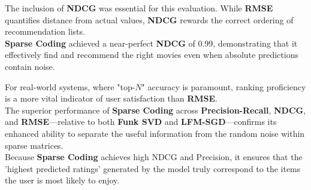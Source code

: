 \documentclass[conference]{IEEEtran}
\begin{document}
The inclusion of \textbf{NDCG} was essential for this evaluation. While \textbf{RMSE} quantifies distance from actual values, \textbf{NDCG} rewards the correct ordering of recommendation lists.\\
\indent \textbf{Sparse Coding} achieved a near-perfect \textbf{NDCG} of 0.99, demonstrating that it effectively find and recommend the right movies even when absolute predictions contain noise. 

For real-world systems, where "top-$N$" accuracy is paramount, ranking proficiency is a more vital indicator of user satisfaction than \textbf{RMSE}.\\
\indent The superior performance of \textbf{Sparse Coding} across \textbf{Precision-Recall}, \textbf{NDCG}, and \textbf{RMSE}---relative to both \textbf{Funk SVD} and \textbf{LFM-SGD}---confirms its enhanced ability to separate the useful information from the random noise within sparse matrices.\\
\indent Because \textbf{Sparse Coding} achieves high NDCG and Precision, it ensures that the 'highest predicted ratings' generated by the model truly correspond to the items the user is most likely to enjoy.
\end{document}
